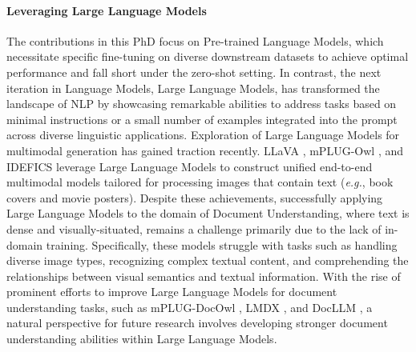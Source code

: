 \paragraph{Leveraging Large Language Models}

The contributions in this PhD focus on Pre-trained Language Models, which necessitate specific fine-tuning on diverse downstream datasets to achieve optimal performance and fall short under the zero-shot setting. In contrast, the next iteration in Language Models, Large Language Models, has transformed the landscape of \ac{NLP} by showcasing remarkable abilities to address tasks based on minimal instructions \citep{wei2021finetuned} or a small number of examples integrated into the prompt \citep{brown2020language} across diverse linguistic applications. Exploration of Large Language Models for multimodal generation has gained traction recently. LLaVA \citep{liu2023visual}, mPLUG-Owl \citep{ye2023mplug}, and IDEFICS \citep{laurenccon2023obelisc} leverage Large Language Models to construct unified end-to-end multimodal models tailored for processing images that contain text (\textit{e.g.}, book covers and movie posters). Despite these achievements, successfully applying Large Language Models to the domain of Document Understanding, where text is dense and visually-situated, remains a challenge primarily due to the lack of in-domain training. Specifically, these models struggle with tasks such as handling diverse image types, recognizing complex textual content, and comprehending the relationships between visual semantics and textual information. With the rise of prominent efforts to improve Large Language Models for document understanding tasks, such as mPLUG-DocOwl \citep{ye2023mplug}, LMDX \citep{perot2023lmdx}, and DocLLM \citep{wang2023docllm}, a natural perspective for future research involves developing stronger document understanding abilities within Large Language Models.


